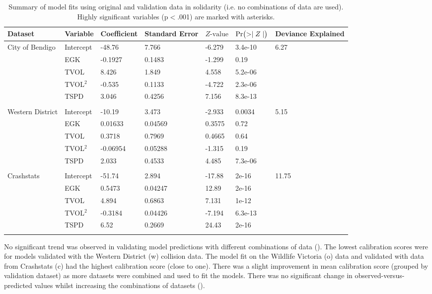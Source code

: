 \begin{table}[htp]
\caption{Summary of model fits using original and validation data in solidarity (i.e. no combinations of data are used). Highly significant variables (p$<$.001) are marked with asterisks.}
\begin{tabularx}{\textwidth}{lllllll} \toprule
Dataset & Variable & Coefficient & Standard Error & $Z\text{-value}$ & $\text{Pr}\bigl( >\mid Z \mid \bigr)$ & Deviance Explained \\ 
  \midrule
City of Bendigo & Intercept & -48.76 & 7.766 & -6.279 & 3.4e-10 & 6.27 \\ 
   & EGK & -0.1927 & 0.1483 & -1.299 & 0.19 &  \\ 
   & TVOL & 8.426 & 1.849 & 4.558 & 5.2e-06 &  \\ 
   & TVOL$^2$ & -0.535 & 0.1133 & -4.722 & 2.3e-06 &  \\ 
   & TSPD & 3.046 & 0.4256 & 7.156 & 8.3e-13 &  \\ 
   &  &  &  &  &  &  \\ 
  Western District & Intercept & -10.19 & 3.473 & -2.933 & 0.0034 & 5.15 \\ 
   & EGK & 0.01633 & 0.04569 & 0.3575 & 0.72 &  \\ 
   & TVOL & 0.3718 & 0.7969 & 0.4665 & 0.64 &  \\ 
   & TVOL$^2$ & -0.06954 & 0.05288 & -1.315 & 0.19 &  \\ 
   & TSPD & 2.033 & 0.4533 & 4.485 & 7.3e-06 &  \\ 
   &  &  &  &  &  &  \\ 
  Crashstats & Intercept & -51.74 & 2.894 & -17.88 & 2e-16 & 11.75 \\ 
   & EGK & 0.5473 & 0.04247 & 12.89 & 2e-16 &  \\ 
   & TVOL & 4.894 & 0.6863 & 7.131 & 1e-12 &  \\ 
   & TVOL$^2$ & -0.3184 & 0.04426 & -7.194 & 6.3e-13 &  \\ 
   & TSPD & 6.52 & 0.2669 & 24.43 & 2e-16 &  \\ 
   &  &  &  &  &  &  \\ 
\bottomrule
\end{tabularx}
\label{val_glm_perf}
\end{table}

No significant trend was observed in validating model predictions with different combinations of data (). The lowest calibration scores were for models validated with the Western District (w) collision data. The model fit on the Wildlife Victoria (o) data and validated with data from Crashstats (c) had the highest calibration score (close to one). There was a slight improvement in mean calibration score (grouped by validation dataset) as more datasets were combined and used to fit the models. There was no significant change in observed-versus-predicted values whilst increasing the combinations of datasets ().

